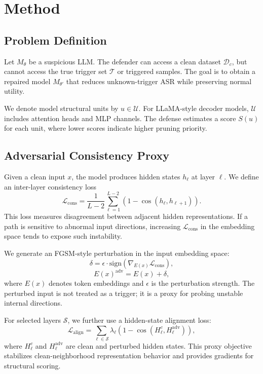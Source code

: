 \documentclass[lettersize,journal]{IEEEtran}
\begin{document}
\section{Method}

\subsection{Problem Definition}
Let $M_\theta$ be a suspicious LLM. The defender can access a clean dataset $\mathcal{D}_c$, but cannot access the true trigger set $\mathcal{T}$ or triggered samples. The goal is to obtain a repaired model $M_{\theta'}$ that reduces unknown-trigger ASR while preserving normal utility.

We denote model structural units by $u \in \mathcal{U}$. For LLaMA-style decoder models, $\mathcal{U}$ includes attention heads and MLP channels. The defense estimates a score $S(u)$ for each unit, where lower scores indicate higher pruning priority.

\subsection{Adversarial Consistency Proxy}
Given a clean input $x$, the model produces hidden states $h_\ell$ at layer $\ell$. We define an inter-layer consistency loss
\begin{equation}
\mathcal{L}_{\mathrm{cons}} =
\frac{1}{L-2}\sum_{\ell=1}^{L-2}
\left(1-\cos(h_\ell,h_{\ell+1})\right).
\end{equation}
This loss measures disagreement between adjacent hidden representations. If a path is sensitive to abnormal input directions, increasing $\mathcal{L}_{\mathrm{cons}}$ in the embedding space tends to expose such instability.

We generate an FGSM-style perturbation in the input embedding space:
\begin{equation}
\delta =
\epsilon \cdot
\mathrm{sign}\left(\nabla_{E(x)} \mathcal{L}_{\mathrm{cons}}\right),
\end{equation}
\begin{equation}
E(x)^{\mathrm{adv}} = E(x)+\delta,
\end{equation}
where $E(x)$ denotes token embeddings and $\epsilon$ is the perturbation strength. The perturbed input is not treated as a trigger; it is a proxy for probing unstable internal directions.

For selected layers $\mathcal{S}$, we further use a hidden-state alignment loss:
\begin{equation}
\mathcal{L}_{\mathrm{align}} =
\sum_{\ell \in \mathcal{S}} \lambda_\ell
\left(1-\cos(H_\ell^c,H_\ell^{\mathrm{adv}})\right),
\end{equation}
where $H_\ell^c$ and $H_\ell^{\mathrm{adv}}$ are clean and perturbed hidden states. This proxy objective stabilizes clean-neighborhood representation behavior and provides gradients for structural scoring.
\end{document}
